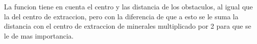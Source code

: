 La funcion tiene en cuenta el centro y las distancia de los obstaculos, al igual que la del centro de extraccion, pero con la diferencia de que a esto se le suma la distancia con el centro de extraccion de minerales multiplicado por 2 para que se le de mas importancia.
